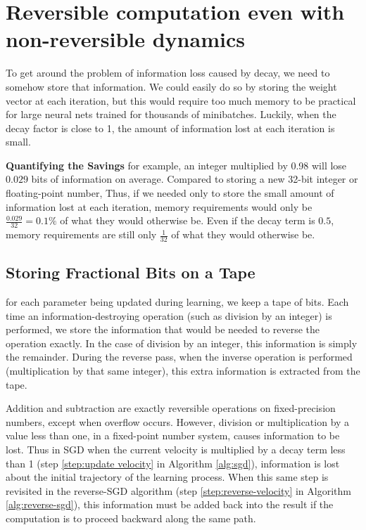 \documentclass{article}
\begin{document}
\section{Reversible computation even with non-reversible dynamics}
\label{sec:reversible computation}
To get around the problem of information loss caused by decay, we need to somehow store that information.
We could easily do so by storing the weight vector at each iteration, but this would require too much memory to be practical for large neural nets trained for thousands of minibatches.
Luckily, when the decay factor is close to 1, the amount of information lost at each iteration is small.

\textbf{Quantifying the Savings}
for example, an integer multiplied by 0.98 will lose $0.029$ bits of information on average.
Compared to storing a new 32-bit integer or floating-point number, 
Thus, if we needed only to store the small amount of information lost at each iteration, memory requirements would only be ${\frac{0.029}{32} = 0.1\%}$ of what they would otherwise be.
Even if the decay term is $0.5$, memory requirements are still only $\frac{1}{32}$ of what they would otherwise be.

\subsection{Storing Fractional Bits on a Tape}

for each parameter being updated during learning, we keep a tape of bits.
Each time an information-destroying operation (such as division by an integer) is performed, we store the information that would be needed to reverse the operation exactly.  In the case of division by an integer, this information is simply the remainder.
During the reverse pass, when the inverse operation is performed (multiplication by that same integer), this extra information is extracted from the tape.

Addition and subtraction are exactly reversible operations on fixed-precision numbers, except when overflow occurs.
However, division or multiplication by a value less than one, in a fixed-point number system, causes information to be lost.
Thus in SGD when the current velocity is multiplied by a decay term less than 1 (step \ref{step:update velocity} in Algorithm \ref{alg:sgd}), information is lost about the initial trajectory of the learning process.
When this same step is revisited in the reverse-SGD algorithm (step \ref{step:reverse-velocity} in Algorithm \ref{alg:reverse-sgd}), this information must be added back into the result if the computation is to proceed backward along the same path.
\end{document}
